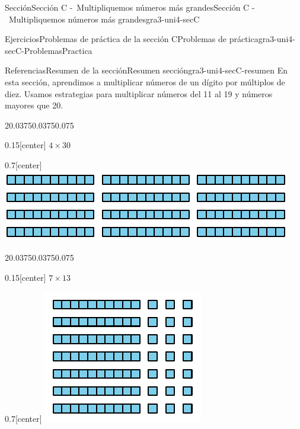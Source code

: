 \documentclass[twoside,10pt,]{article}
\begin{document}
\begin{sectionptx}{Sección}{Sección C -~Multipliquemos números más grandes}{}{Sección C -~Multipliquemos números más grandes}{}{}{gra3-uni4-secC}
\begin{exercises-subsection}{Ejercicios}{Problemas de práctica de la sección C}{}{Problemas de práctica}{}{}{gra3-uni4-secC-ProblemasPractica}
\end{exercises-subsection}
%
%
\typeout{************************************************}
\typeout{************************************************}
%
\begin{references-subsection}{Referencias}{Resumen de la sección}{}{Resumen sección}{}{}{gra3-uni4-secC-resumen}
En esta sección, aprendimos a multiplicar números de un dígito por múltiplos de diez. Usamos estrategias para multiplicar números del 11 al 19 y números mayores que 20.%
\begin{sidebyside}{2}{0.0375}{0.0375}{0.075}%
\begin{sbspanel}{0.15}[center]%
\(4\times 30\)%
\end{sbspanel}%
\begin{sbspanel}{0.7}[center]%
\includegraphics[width=\linewidth]{external/svg-source/tikz-file-147742-scale13.pdf}
\end{sbspanel}%
\end{sidebyside}%
\begin{sidebyside}{2}{0.0375}{0.0375}{0.075}%
\begin{sbspanel}{0.15}[center]%
\(7\times 13\)%
\end{sbspanel}%
\begin{sbspanel}{0.7}[center]%
\includegraphics[width=\linewidth]{external/svg-source/tikz-file-141823-scale13.pdf}

\end{sbspanel}
\end{sidebyside}
\end{references-subsection}
\end{sectionptx}
\end{document}
